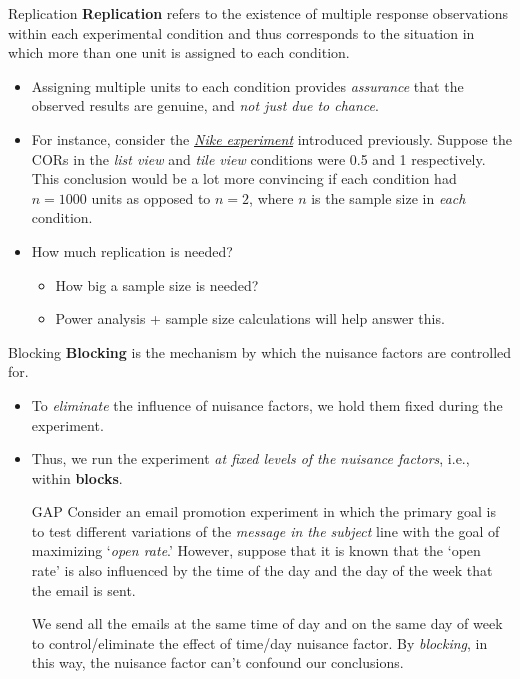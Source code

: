 \begin{Definition}{Replication}{}
    \textbf{Replication} refers to the existence of multiple response observations
    within each experimental condition and thus corresponds to the situation in which
    more than one unit is assigned to each condition.
\end{Definition}
\begin{itemize}
    \item Assigning multiple units to each condition provides \emph{assurance} that the
          observed results are genuine, and \emph{not just due to chance}.
    \item For instance, consider the \emph{\hyperref[ex:nike_ex]{Nike experiment}}
          introduced previously. Suppose the CORs in the \emph{list view} and
          \emph{tile view} conditions were 0.5 and 1 respectively. This conclusion would be
          a lot more convincing if each condition had $ n=1000 $ units as opposed to $ n=2 $,
          where $ n $ is the sample size in \emph{each} condition.
    \item How much replication is needed?
          \begin{itemize}
              \item How big a sample size is needed?
              \item Power analysis + sample size calculations will help answer this.
          \end{itemize}
\end{itemize}
\begin{Definition}{Blocking}{}
    \textbf{Blocking} is the mechanism by which the nuisance factors are controlled for.
\end{Definition}
\begin{itemize}
    \item To \emph{eliminate} the influence of nuisance factors, we hold them fixed during
          the experiment.
    \item Thus, we run the experiment \emph{at fixed levels of the nuisance factors}, i.e.,
          within \textbf{blocks}.

          \begin{Example}{GAP}{}
              Consider an email promotion experiment in which the primary goal is to
              test different variations of the \emph{message in the subject} line with the goal of
              maximizing `\emph{open rate}.' However, suppose that it is known that the
              `open rate' is also influenced by the time of the day and the day of the week that
              the email is sent.

              \vspace{2mm}

              We send all the emails at the same time of day and on the same day of week
              to control/eliminate the effect of time/day nuisance factor. By \emph{blocking},
              in this way, the nuisance factor can't confound our conclusions.
          \end{Example}
\end{itemize}
